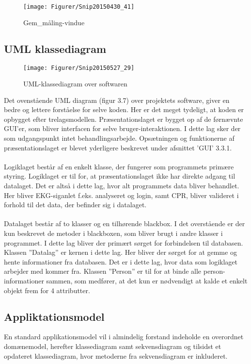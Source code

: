 \begin{figure}[H]
	\centering
	\texttt{[image: Figurer/Snip20150430\_41]}
	\caption{Gem\_måling-vindue}
\end{figure}

\subsection{UML klassediagram}

\begin{figure}[H]
	\centering
	\texttt{[image: Figurer/Snip20150527\_29]}
	\caption{UML-klassediagram over softwaren}
\end{figure}

Det ovenstående UML diagram (figur 3.7) over projektets software, giver en bedre og lettere forståelse for selve koden. Her er det meget tydeligt, at koden er opbygget efter trelagsmodellen. Præsentationslaget er bygget op af de førnævnte GUI’er, som bliver interfacen for selve bruger-interaktionen. I dette lag sker der som udgangspunkt intet behandlingsarbejde. Opsætningen og funktionerne af præsentationslaget er blevet yderligere beskrevet under afsnittet ’GUI’ 3.3.1.\\ \\
Logiklaget består af en enkelt klasse, der fungerer som programmets primære styring. Logiklaget er til for, at præsentationslaget ikke har direkte adgang til datalaget. Det er altså i dette lag, hvor alt programmets data bliver behandlet.  Her bliver EKG-siganlet f.eks. analyseret og login, samt CPR, bliver valideret i forhold til det data, der befinder sig i datalaget. \\ \\
Datalaget består af to klasser og en tilhørende blackbox. I det overstående er der kun beskrevet de metoder i blackboxen, som bliver brugt i andre klasser i programmet. I dette lag bliver der primært sørget for forbindelsen til databasen. Klassen ”Datalag” er kernen i dette lag. Her bliver der sørget for at gemme og hente informationer fra databasen. Det er i dette lag, hvor data som logiklaget arbejder med kommer fra. Klassen ”Person” er til for at binde alle person-informationer sammen, som medfører, at det kun er nødvendigt at kalde et enkelt objekt frem for 4 attributter. 

\subsection{Appliktationsmodel}
En standard applikationsmodel vil i almindelig forstand indeholde en overordnet domænemodel, herefter klassediagram samt sekvensdiagram og tilsidst et opdateret klassediagram, hvor metoderne fra sekvensdiagram er inkluderet. 

